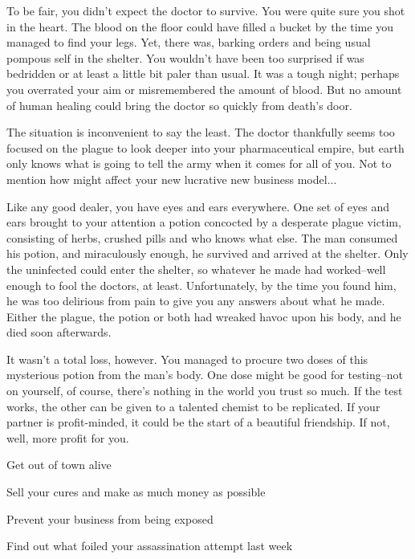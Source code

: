 \documentclass[char]{Pestilence}
\begin{document}
To be fair, you didn't expect the doctor to survive. You were quite sure you shot \cOutsider{\them} in the heart. The blood on the floor could have filled a bucket by the time you managed to find your legs. Yet, there \cOutsider{\they} was, barking orders and being \cOutsider{\their} usual pompous self in the shelter. You wouldn't have been too surprised if \cOutsider{\they} was bedridden or at least a little bit paler than usual. It was a tough night; perhaps you overrated your aim or misremembered the amount of blood. But no amount of human healing could bring the doctor so quickly from death's door.

The situation is inconvenient to say the least. The doctor thankfully seems too focused on the plague to look deeper into your pharmaceutical empire, but earth only knows what \cOutsider{\they} is going to tell the army when it comes for all of you. Not to mention how \cOutsider{\they} might affect your new lucrative new business model...

Like any good dealer, you have eyes and ears everywhere. One set of eyes and ears brought to your attention a potion concocted by a desperate plague victim, consisting of herbs, crushed pills and who knows what else. The man consumed his potion, and miraculously enough, he survived and arrived at the shelter. Only the uninfected could enter the shelter, so whatever he made had worked--well enough to fool the doctors, at least. Unfortunately, by the time you found him, he was too delirious from pain to give you any answers about what he made. Either the plague, the potion or both had wreaked havoc upon his body, and he died soon afterwards. 

It wasn't a total loss, however. You managed to procure two doses of this mysterious potion from the man's body. One dose might be good for testing--not on yourself, of course, there's nothing in the world you trust so much. If the test works, the other can be given to a talented chemist to be replicated. If your partner is profit-minded, it could be the start of a beautiful friendship. If not, well, more profit for you.

\begin{itemz}[Goals]
	\item Get out of town alive
	\item Sell your cures and make as much money as possible
	\item Prevent your business from being exposed
	\item Find out what foiled your assassination attempt last week
\end{itemz}
\end{document}
